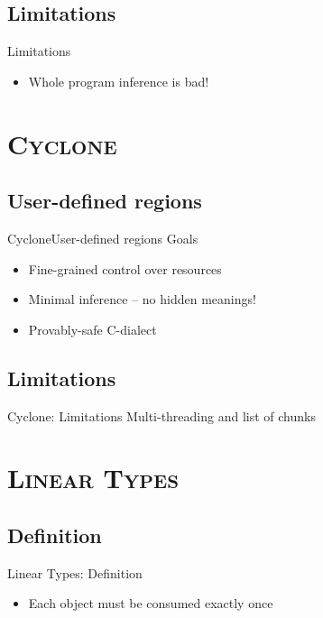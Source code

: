\documentclass[xcolor=x11names,compress]{beamer}
\renewcommand{\(}{\begin{columns}}
\renewcommand{\)}{\end{columns}}
\newcommand{\<}[1]{\begin{column}{#1}}
\renewcommand{\>}{\end{column}}
\begin{document}
\subsection{Limitations}
\begin{frame}{Limitations}
    \begin{itemize}
        \item Whole program inference is bad!
    \end{itemize}
\end{frame}

\section{\scshape Cyclone}
\subsection{User-defined regions}
\begin{frame}{Cyclone}{User-defined regions}
    {\large Goals}
    \begin{itemize}
        \item Fine-grained control over resources
        \item Minimal inference -- no hidden meanings!
        \item Provably-safe C-dialect
    \end{itemize}
\end{frame}

\subsection{Limitations}
\begin{frame}{Cyclone: Limitations}
    Multi-threading and list of chunks
\end{frame}

\section{\scshape Linear Types}
\subsection{Definition}
\begin{frame}{Linear Types: Definition}
    \begin{itemize}
        \item Each object must be consumed exactly once
    \end{itemize}
\end{frame}
\end{document}
